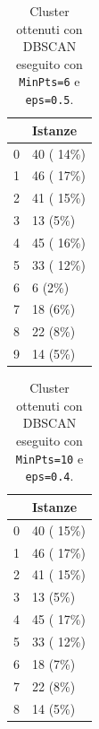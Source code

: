 \documentclass[12pt]{article}
\begin{document}
\begin{table}[H]
\centering
\begin{tabular}{l|l|}
\cline{2-2}
                        & Istanze    \\ \hline
\multicolumn{1}{|l|}{0} & 40 ( 14\%) \\ \hline
\multicolumn{1}{|l|}{1} & 46 ( 17\%) \\ \hline
\multicolumn{1}{|l|}{2} & 41 ( 15\%) \\ \hline
\multicolumn{1}{|l|}{3} & 13 (5\%)   \\ \hline
\multicolumn{1}{|l|}{4} & 45 ( 16\%) \\ \hline
\multicolumn{1}{|l|}{5} & 33 ( 12\%) \\ \hline
\multicolumn{1}{|l|}{6} & 6 (2\%)    \\ \hline
\multicolumn{1}{|l|}{7} & 18 (6\%)   \\ \hline
\multicolumn{1}{|l|}{8} & 22 (8\%)   \\ \hline
\multicolumn{1}{|l|}{9} & 14 (5\%)   \\ \hline
\end{tabular}
\caption{Cluster ottenuti con DBSCAN eseguito con \texttt{MinPts=6} e \texttt{eps=0.5}.}
\label{tab:dbscan605}
\end{table}
\begin{table}[H]
\centering
\begin{tabular}{l|l|}
\cline{2-2}
                        & Istanze    \\ \hline
\multicolumn{1}{|l|}{0} & 40 ( 15\%) \\ \hline
\multicolumn{1}{|l|}{1} & 46 ( 17\%) \\ \hline
\multicolumn{1}{|l|}{2} & 41 ( 15\%) \\ \hline
\multicolumn{1}{|l|}{3} & 13 (5\%)   \\ \hline
\multicolumn{1}{|l|}{4} & 45 ( 17\%) \\ \hline
\multicolumn{1}{|l|}{5} & 33 ( 12\%) \\ \hline
\multicolumn{1}{|l|}{6} & 18 (7\%)   \\ \hline
\multicolumn{1}{|l|}{7} & 22 (8\%)   \\ \hline
\multicolumn{1}{|l|}{8} & 14 (5\%)   \\ \hline
\end{tabular}
\caption{Cluster ottenuti con DBSCAN eseguito con \texttt{MinPts=10} e \texttt{eps=0.4}.}
\label{tab:dbscan1004}
\end{table}
\end{document}
